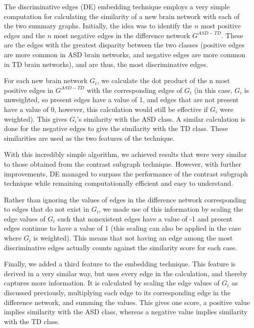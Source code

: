 \documentclass[letterpaper]{article}
\begin{document}
The discriminative edges (DE) embedding technique employs a very simple computation for calculating the similarity of a new brain network with each of the two summary graphs.
Initially, the idea was to identify the $n$ most positive edges and the $n$ most negative edges in the difference network $G^{ASD - TD}$.
These are the edges with the greatest disparity between the two classes (positive edges are more common in ASD brain networks, and negative edges are more common in TD brain networks), and are thus, the most discriminative edges.

For each new brain network $G_i$, we calculate the dot product of the n most positive edges in $G^{ASD - TD}$ with the corresponding edges of $G_i$ (in this case, $G_i$ is unweighted, so present edges have a value of 1, and edges that are not present have a value of 0, however, this calculation would still be effective if $G_i$ were weighted).
This gives $G_i$'s similarity with the ASD class.
A similar calculation is done for the negative edges to give the similarity with the TD class.
These similarities are used as the two features of the technique.

With this incredibly simple algorithm, we achieved results that were very similar to those obtained from the contrast subgraph technique.
However, with further improvements, DE managed to surpass the performance of the contrast subgraph technique while remaining computationally efficient and easy to understand.

Rather than ignoring the values of edges in the difference network corresponding to edges that do not exist in $G_i$, we made use of this information by scaling the edge values of $G_i$ such that nonexistent edges have a value of -1 and present edges continue to have a value of 1 (this scaling can also be applied in the case where $G_i$ is weighted).
This means that not having an edge among the most discriminative edges actually counts against the similarity score for each case.

Finally, we added a third feature to the embedding technique.
This feature is derived in a very similar way, but uses every edge in the calculation, and thereby captures more information.
It is calculated by scaling the edge values of $G_i$ as discussed previously, multiplying each edge to its corresponding edge in the difference network, and summing the values.
This gives one score, a positive value implies similarity with the ASD class, whereas a negative value implies similarity with the TD class.
\end{document}
